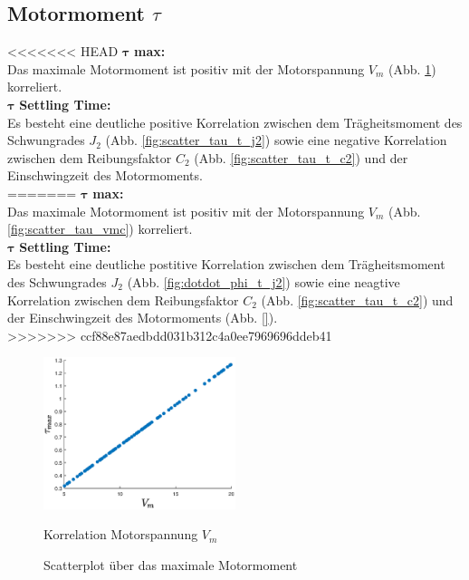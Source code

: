 \subsection*{Motormoment $\tau$}
<<<<<<< HEAD
$\bm{\tau}$ \textbf{max: }\\Das maximale Motormoment ist positiv mit der Motorspannung $V_m$ (Abb. \ref{fig:scatter_tau_vm}) korreliert.\\

$\bm{\tau}$ \textbf{Settling Time: }\\
Es besteht eine deutliche positive Korrelation zwischen dem Trägheitsmoment des Schwungrades $J_2$ (Abb. \ref{fig:scatter_tau_t_j2}) sowie eine negative Korrelation zwischen dem Reibungsfaktor $C_2$ (Abb. \ref{fig:scatter_tau_t_c2}) und der Einschwingzeit des Motormoments.\\
=======
$\bm{\tau}$ \textbf{max: }\\Das maximale Motormoment ist positiv mit der Motorspannung $V_m$ (Abb. \ref{fig:scatter_tau_vmc}) korreliert.\\

$\bm{\tau}$ \textbf{Settling Time: }\\
Es besteht eine deutliche postitive Korrelation zwischen dem Trägheitsmoment des Schwungrades $J_2$ (Abb. \ref{fig:dotdot_phi_t_j2}) sowie eine neagtive Korrelation zwischen dem Reibungsfaktor $C_2$ (Abb. \ref{fig:scatter_tau_t_c2}) und der Einschwingzeit des Motormoments (Abb. \ref{}).\\
>>>>>>> ccf88e87aedbdd031b312c4a0ee7969696ddeb41
\begin{figure}
    \centering
        \centering
        \includegraphics[width=0.5\textwidth]{Bilder/5_sensi/cm/tau_max_vm.eps}
        \caption{Korrelation Motorspannung $V_m$}
        \label{fig:scatter_tau_vm}
    \caption{Scatterplot über das maximale Motormoment}
\end{figure}
 


